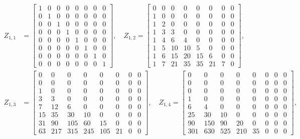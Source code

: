 \begin{displaymath}
\begin{split}
Z_{1,1} &= \left[\begin{matrix}1 & 0 & 0 & 0 & 0 & 0 & 0 & 0\\0 & 1 & 0 & 0 & 0 & 0 & 0 & 0\\0 & 0 & 1 & 0 & 0 & 0 & 0 & 0\\0 & 0 & 0 & 1 & 0 & 0 & 0 & 0\\0 & 0 & 0 & 0 & 1 & 0 & 0 & 0\\0 & 0 & 0 & 0 & 0 & 1 & 0 & 0\\0 & 0 & 0 & 0 & 0 & 0 & 1 & 0\\0 & 0 & 0 & 0 & 0 & 0 & 0 & 1\end{matrix}\right], \quad Z_{1,2} = \left[\begin{matrix}0 & 0 & 0 & 0 & 0 & 0 & 0 & 0\\1 & 0 & 0 & 0 & 0 & 0 & 0 & 0\\1 & 2 & 0 & 0 & 0 & 0 & 0 & 0\\1 & 3 & 3 & 0 & 0 & 0 & 0 & 0\\1 & 4 & 6 & 4 & 0 & 0 & 0 & 0\\1 & 5 & 10 & 10 & 5 & 0 & 0 & 0\\1 & 6 & 15 & 20 & 15 & 6 & 0 & 0\\1 & 7 & 21 & 35 & 35 & 21 & 7 & 0\end{matrix}\right], \\
Z_{1,3} &= \left[\begin{matrix}0 & 0 & 0 & 0 & 0 & 0 & 0 & 0\\0 & 0 & 0 & 0 & 0 & 0 & 0 & 0\\1 & 0 & 0 & 0 & 0 & 0 & 0 & 0\\3 & 3 & 0 & 0 & 0 & 0 & 0 & 0\\7 & 12 & 6 & 0 & 0 & 0 & 0 & 0\\15 & 35 & 30 & 10 & 0 & 0 & 0 & 0\\31 & 90 & 105 & 60 & 15 & 0 & 0 & 0\\63 & 217 & 315 & 245 & 105 & 21 & 0 & 0\end{matrix}\right], \quad Z_{1,4} = \left[\begin{matrix}0 & 0 & 0 & 0 & 0 & 0 & 0 & 0\\0 & 0 & 0 & 0 & 0 & 0 & 0 & 0\\0 & 0 & 0 & 0 & 0 & 0 & 0 & 0\\1 & 0 & 0 & 0 & 0 & 0 & 0 & 0\\6 & 4 & 0 & 0 & 0 & 0 & 0 & 0\\25 & 30 & 10 & 0 & 0 & 0 & 0 & 0\\90 & 150 & 90 & 20 & 0 & 0 & 0 & 0\\301 & 630 & 525 & 210 & 35 & 0 & 0 & 0\end{matrix}\right], \\

\end{split}
\end{displaymath}
